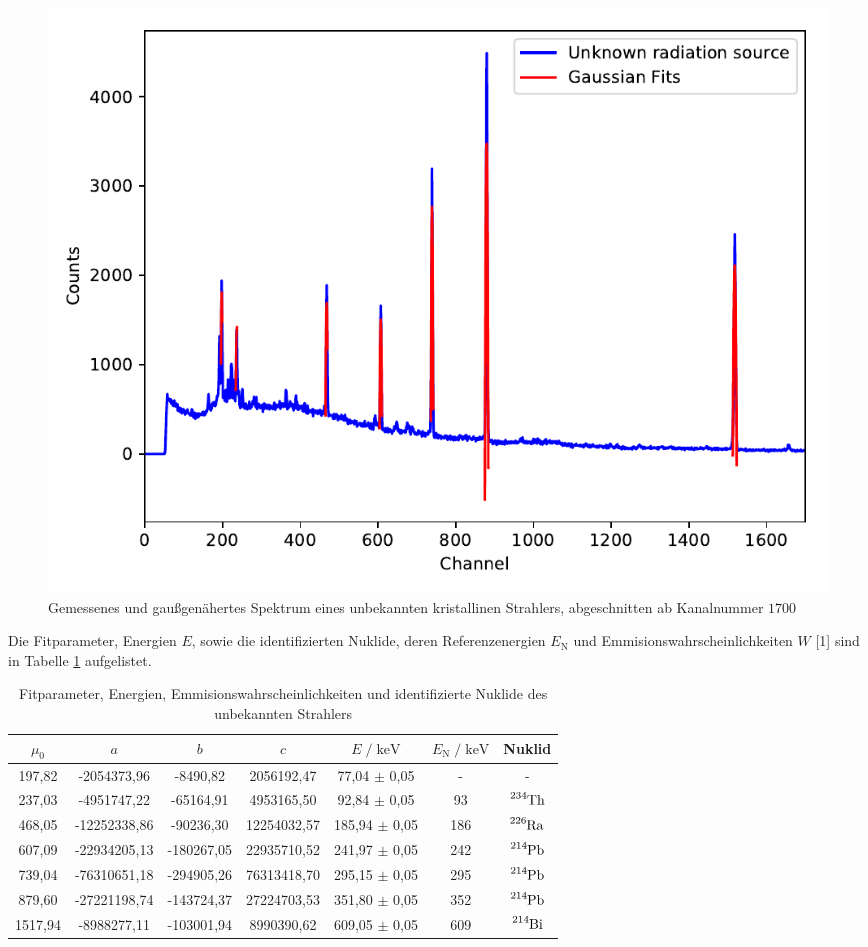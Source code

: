 \begin{figure}
  \centering
  \includegraphics[scale=0.7]{content/plot4.pdf}
  \caption{Gemessenes und gaußgenähertes Spektrum eines unbekannten kristallinen Strahlers,
           abgeschnitten ab Kanalnummer $\num{1700}$}
  \label{fig:plot4} 
\end{figure}

Die Fitparameter, Energien $E$, sowie die identifizierten Nuklide, deren Referenzenergien $E_\text{N}$ und 
Emmisionswahrscheinlichkeiten $W$ [1] sind in Tabelle \ref{tab:mess7} aufgelistet. \\

\begin{table}
  \centering
  \caption{Fitparameter, Energien, Emmisionswahrscheinlichkeiten und identifizierte Nuklide des unbekannten Strahlers}
  \label{tab:mess7}
  \begin{tabular}{c c c c c c c}
  \toprule
  $\mu_0$ & $a$ & $b$ & $c$ & $E \;/\; \si{\kilo\eV}$ & $E_\text{N} \;/\; \si{\kilo\eV}$ & Nuklid \\
  \midrule
   197,82 &  -2054373,96 &   -8490,82 &  2056192,47 &  77,04 $\pm$ 0,05 &   - &               - \\
   237,03 &  -4951747,22 &  -65164,91 &  4953165,50 &  92,84 $\pm$ 0,05 &  93 & $\ce{^{234}Th}$ \\
   468,05 & -12252338,86 &  -90236,30 & 12254032,57 & 185,94 $\pm$ 0,05 & 186 & $\ce{^{226}Ra}$ \\
   607,09 & -22934205,13 & -180267,05 & 22935710,52 & 241,97 $\pm$ 0,05 & 242 & $\ce{^{214}Pb}$ \\
   739,04 & -76310651,18 & -294905,26 & 76313418,70 & 295,15 $\pm$ 0,05 & 295 & $\ce{^{214}Pb}$ \\  
   879,60 & -27221198,74 & -143724,37 & 27224703,53 & 351,80 $\pm$ 0,05 & 352 & $\ce{^{214}Pb}$ \\
  1517,94 &  -8988277,11 & -103001,94 &  8990390,62 & 609,05 $\pm$ 0,05 & 609 & $\ce{^{214}Bi}$ \\
  \bottomrule
  \end{tabular}
\end{table}

